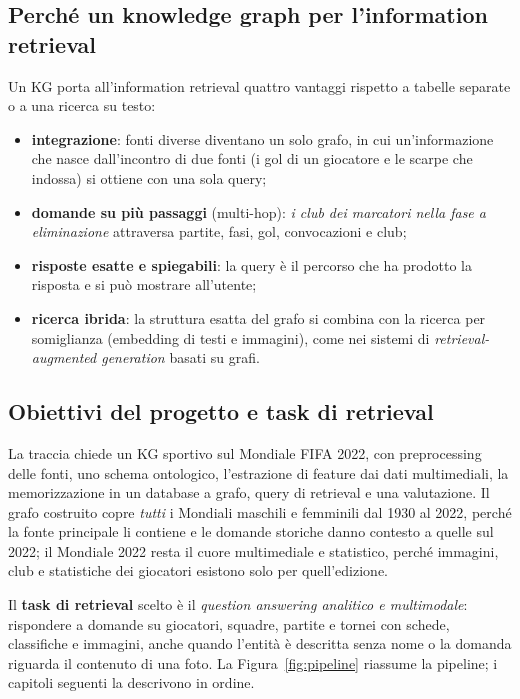 \documentclass[11pt,a4paper]{article}
\begin{document}
\subsection{Perché un knowledge graph per l'information retrieval}
Un KG porta all'information retrieval quattro vantaggi rispetto a tabelle separate o a una ricerca su testo:
\begin{itemize}
  \item \textbf{integrazione}: fonti diverse diventano un solo grafo, in cui un'informazione che nasce dall'incontro di due fonti (i gol di un giocatore e le scarpe che indossa) si ottiene con una sola query;
  \item \textbf{domande su più passaggi} (multi-hop): \emph{i club dei marcatori nella fase a eliminazione} attraversa partite, fasi, gol, convocazioni e club;
  \item \textbf{risposte esatte e spiegabili}: la query è il percorso che ha prodotto la risposta e si può mostrare all'utente;
  \item \textbf{ricerca ibrida}: la struttura esatta del grafo si combina con la ricerca per somiglianza (embedding di testi e immagini), come nei sistemi di \emph{retrieval-augmented generation} basati su grafi.
\end{itemize}

\subsection{Obiettivi del progetto e task di retrieval}
La traccia chiede un KG sportivo sul Mondiale FIFA 2022, con preprocessing delle fonti, uno schema ontologico, l'estrazione di feature dai dati multimediali, la memorizzazione in un database a grafo, query di retrieval e una valutazione. Il grafo costruito copre \emph{tutti} i Mondiali maschili e femminili dal 1930 al 2022, perché la fonte principale li contiene e le domande storiche danno contesto a quelle sul 2022; il Mondiale 2022 resta il cuore multimediale e statistico, perché immagini, club e statistiche dei giocatori esistono solo per quell'edizione.

Il \textbf{task di retrieval} scelto è il \emph{question answering analitico e multimodale}: rispondere a domande su giocatori, squadre, partite e tornei con schede, classifiche e immagini, anche quando l'entità è descritta senza nome o la domanda riguarda il contenuto di una foto. La Figura~\ref{fig:pipeline} riassume la pipeline; i capitoli seguenti la descrivono in ordine.
\end{document}
